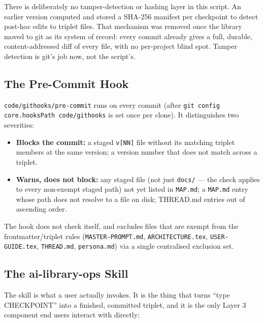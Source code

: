\documentclass[12pt,letterpaper]{article}
\begin{document}
There is deliberately no tamper-detection or hashing layer in this
script. An earlier version computed and stored a SHA-256 manifest per
checkpoint to detect post-hoc edits to triplet files. That mechanism
was removed once the library moved to git as its system of record:
every commit already gives a full, durable, content-addressed diff of
every file, with no per-project blind spot. Tamper detection is git's
job now, not the script's.

\subsection{The Pre-Commit Hook}

\texttt{code/githooks/pre-commit} runs on every commit (after
\texttt{git config core.hooksPath code/githooks} is set once per
clone). It distinguishes two severities:

\begin{itemize}
  \item \textbf{Blocks the commit:} a staged \texttt{v[NN]} file without
        its matching triplet members at the same version; a version
        number that does not match across a triplet.
  \item \textbf{Warns, does not block:} any staged file (not just
        \texttt{docs/} --- the check applies to every non-exempt staged
        path) not yet listed in \texttt{MAP.md}; a \texttt{MAP.md} entry
        whose path does not resolve to a file on disk; THREAD.md entries
        out of ascending order.
\end{itemize}

The hook does not check itself, and excludes files that are exempt from
the frontmatter/triplet rules (\texttt{MASTER-PROMPT.md},
\texttt{ARCHITECTURE.tex}, \texttt{USER-GUIDE.tex}, \texttt{THREAD.md},
\texttt{persona.md}) via a single centralised exclusion set.

\subsection{The ai-library-ops Skill}

The skill is what a user actually invokes. It is the thing that turns
``type CHECKPOINT'' into a finished, committed triplet, and it is the
only Layer 3 component end users interact with directly:
\end{document}
